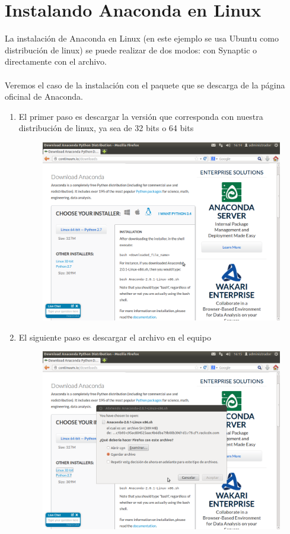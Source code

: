 \documentclass[12pt]{article}
\begin{document}
\section{Instalando Anaconda en Linux}
La instalación de Anaconda en Linux (en este ejemplo se usa Ubuntu como distribución de linux) se puede realizar de dos modos: con Synaptic o directamente con el archivo.
\\
\\
Veremos el caso de  la instalación con el paquete que se descarga de la página oficinal de Anaconda.
\begin{enumerate}
\item El primer paso es descargar la versión que corresponda con nuestra distribución de linux, ya sea de 32 bits o 64 bits
\begin{figure}[H]
	\centering
	\includegraphics[scale=0.35]{Imagenes/Anaconda_Linux_01.png} 
\end{figure}
\item El siguiente paso es descargar el archivo en el equipo
\begin{figure}[H]
	\centering
	\includegraphics[scale=0.35]{Imagenes/Anaconda_Linux_02.png} 

\end{figure}
\end{enumerate}
\end{document}
